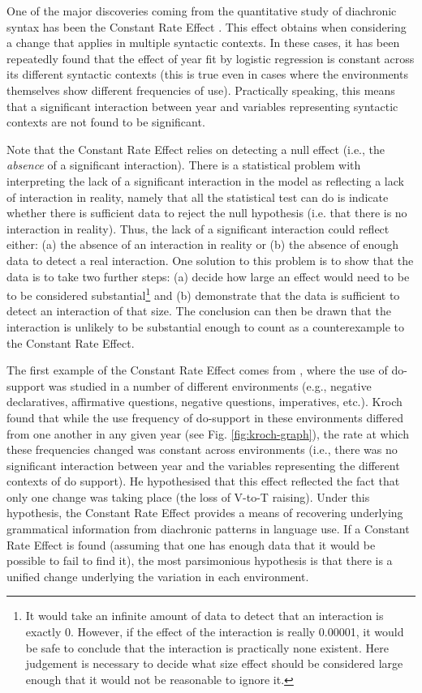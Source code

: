 	One of the major discoveries coming from the quantitative study of diachronic syntax has been the Constant Rate Effect \citep{Kroch.1989,Kroch.1994}. This effect obtains when considering a change that applies in multiple syntactic contexts. In these cases, it has been repeatedly found that the effect of year fit by logistic regression is constant across its different syntactic contexts (this is true even in cases where the environments themselves show different frequencies of use). Practically speaking, this means that a significant interaction between year and variables representing syntactic contexts are not found to be significant.

	Note that the Constant Rate Effect relies on detecting a null effect (i.e., the \textit{absence} of a significant interaction). There is a statistical problem with interpreting the lack of a significant interaction in the model as reflecting a lack of interaction in reality, namely that all the statistical test can do is indicate whether there is sufficient data to reject the null hypothesis (i.e. that there is no interaction in reality). Thus, the lack of a significant interaction could reflect either: (a) the absence of an interaction in reality or (b) the absence of enough data to detect a real interaction. One solution to this problem is to show that the data is to take two further steps: (a) decide how large an effect would need to be to be considered substantial\footnote{It would take an infinite amount of data to detect that an interaction is exactly 0. However, if the effect of the interaction is really 0.00001, it would be safe to conclude that the interaction is practically none existent. Here judgement is necessary to decide what size effect should be considered large enough that it would not be reasonable to ignore it.} and (b) demonstrate that the data is sufficient to detect an interaction of that size. The conclusion can then be drawn that the interaction is unlikely to be substantial enough to count as a counterexample to the Constant Rate Effect.

	The first example of the Constant Rate Effect comes from \cite{Kroch.1989}, where the use of do-support was studied in a number of different environments (e.g., negative declaratives, affirmative questions, negative questions, imperatives, etc.). Kroch found that while the use frequency of do-support in these environments differed from one another in any given year (see Fig. \ref{fig:kroch-graph}), the rate at which these frequencies changed was constant across environments (i.e., there was no significant interaction between year and the variables representing the different contexts of do support). He hypothesised that this effect reflected the fact that only one change was taking place (the loss of V-to-T raising). Under this hypothesis, the Constant Rate Effect provides a means of recovering underlying grammatical information from diachronic patterns in language use. If a Constant Rate Effect is found (assuming that one has enough data that it would be possible to fail to find it), the most parsimonious hypothesis is that there is a unified change underlying the variation in each environment.

